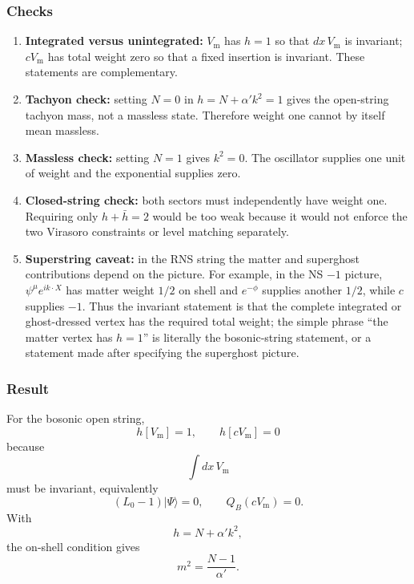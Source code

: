 \documentclass[
  10pt,
  a4paper,
  openany]{book}
\begin{document}
\subsubsection{Checks}\label{checks-11}

\begin{enumerate}
\def\labelenumi{\arabic{enumi}.}
\item
  \textbf{Integrated versus unintegrated:} \(V_{\mathrm m}\) has \(h=1\)
  so that \(dx\,V_{\mathrm m}\) is invariant; \(cV_{\mathrm m}\) has
  total weight zero so that a fixed insertion is invariant. These
  statements are complementary.
\item
  \textbf{Tachyon check:} setting \(N=0\) in \(h=N+\alpha'k^2=1\) gives
  the open-string tachyon mass, not a massless state. Therefore weight
  one cannot by itself mean massless.
\item
  \textbf{Massless check:} setting \(N=1\) gives \(k^2=0\). The
  oscillator supplies one unit of weight and the exponential supplies
  zero.
\item
  \textbf{Closed-string check:} both sectors must independently have
  weight one. Requiring only \(h+\bar h=2\) would be too weak because it
  would not enforce the two Virasoro constraints or level matching
  separately.
\item
  \textbf{Superstring caveat:} in the RNS string the matter and
  superghost contributions depend on the picture. For example, in the NS
  \(-1\) picture, \(\psi^\mu e^{ik\cdot X}\) has matter weight \(1/2\)
  on shell and \(e^{-\phi}\) supplies another \(1/2\), while \(c\)
  supplies \(-1\). Thus the invariant statement is that the complete
  integrated or ghost-dressed vertex has the required total weight; the
  simple phrase ``the matter vertex has \(h=1\)'' is literally the
  bosonic-string statement, or a statement made after specifying the
  superghost picture.
\end{enumerate}

\subsubsection{Result}\label{result-15}

For the bosonic open string, \[
\boxed{
h[V_{\mathrm m}]=1,
\qquad
h[cV_{\mathrm m}]=0
}
\] because \[
\int dx\,V_{\mathrm m}
\] must be invariant, equivalently \[
(L_0-1)|\Psi\rangle=0,
\qquad
Q_B(cV_{\mathrm m})=0.
\] With \[
h=N+\alpha'k^2,
\] the on-shell condition gives \[
m^2=\frac{N-1}{\alpha'}.
\]
\end{document}
